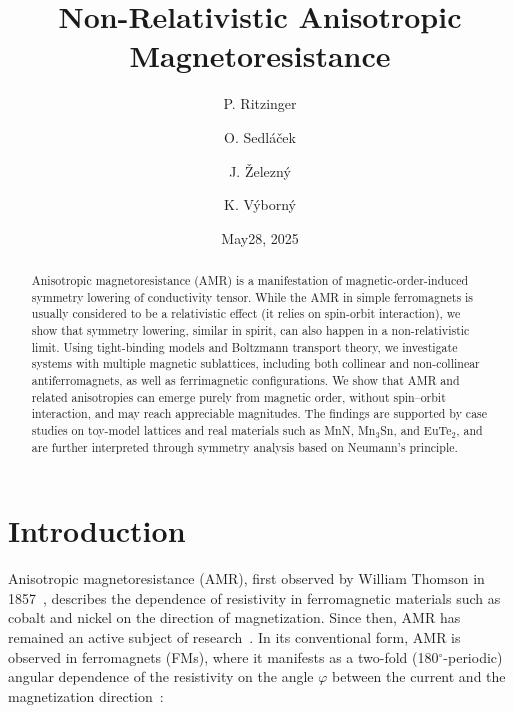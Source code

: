 \documentclass[prb,showpacs,amsmath,amssymb,superscriptaddress,twocolumn,floatfix]{revtex4-1}
\begin{document}
\title{Non-Relativistic Anisotropic Magnetoresistance}

\author{P. Ritzinger}

\author{O. Sedl\'a\v cek}
\author{J. \v Zelezn\'y}

\author{K. V\'yborn\'y}


\date{May28, 2025}

\begin{abstract}
Anisotropic magnetoresistance (AMR) is a manifestation of
magnetic-order-induced symmetry lowering of conductivity tensor. While the AMR in simple ferromagnets is usually considered to be a relativistic effect (it relies on spin-orbit interaction), we show that symmetry lowering, similar in spirit, can also happen in a non-relativistic limit. Using tight-binding models and Boltzmann transport theory, we investigate systems with multiple magnetic sublattices, including both collinear and non-collinear antiferromagnets, as well as ferrimagnetic configurations. We show that AMR and related anisotropies can emerge purely from magnetic order, without spin–orbit interaction, and may reach appreciable magnitudes. The findings are supported by case studies on toy-model lattices and real materials such as MnN, Mn$_3$Sn, and EuTe$_2$, and are further interpreted through symmetry analysis based on Neumann’s principle.
\end{abstract}


\maketitle


\section{Introduction}

Anisotropic magnetoresistance (AMR), first observed by William Thomson in 1857~\cite{Thomson:1857}, describes the dependence of resistivity in ferromagnetic materials such as cobalt and nickel on the direction of magnetization. Since then, AMR has remained an active subject of research~\cite{Ritzinger:2023}. In its conventional form, AMR is observed in ferromagnets (FMs), where it manifests as a two-fold (180$^\circ$-periodic) angular dependence of the resistivity on the angle $\varphi$ between the current and the magnetization direction~\cite{Alagoz:2015}:
\end{document}
